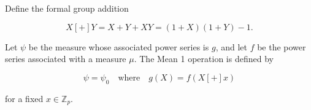 Define the formal group addition

$$X [+] Y = X + Y + XY = (1 + X)(1 + Y) - 1.$$

Let $\psi$ be the measure whose associated power series is $g$, and let $f$ be the power series associated with a measure $\mu$. The Mean 1 operation is defined by

$$\psi = \psi_0 \quad \text{where} \quad g(X) = f(X [+] x)$$

for a fixed $x \in \mathbb{Z}_p$.
